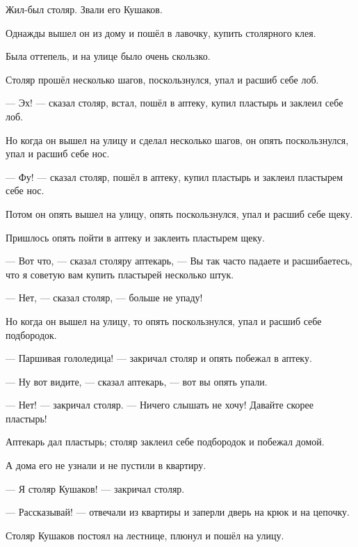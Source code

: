 Жил-был столяр. Звали его Кушаков.

Однажды вышел он из дому и пошёл в лавочку, купить столярного клея.

Была оттепель, и на улице было очень скользко.

Столяр прошёл несколько шагов, поскользнулся, упал и расшиб себе лоб.

--- Эх! --- сказал столяр, встал, пошёл в аптеку, купил пластырь и заклеил себе лоб.

Но когда он вышел на улицу и сделал несколько шагов, он опять поскользнулся, упал и расшиб себе нос.

--- Фу! --- сказал столяр, пошёл в аптеку, купил пластырь и заклеил пластырем себе нос.

Потом он опять вышел на улицу, опять поскользнулся, упал и расшиб себе щеку.

Пришлось опять пойти в аптеку и заклеить пластырем щеку.

--- Вот что, --- сказал столяру аптекарь, --- Вы так часто падаете и расшибаетесь, что я советую вам купить пластырей несколько штук.

--- Нет, --- сказал столяр, --- больше не упаду!

Но когда он вышел на улицу, то опять поскользнулся, упал и расшиб себе подбородок.

--- Паршивая гололедица! --- закричал столяр и опять побежал в аптеку.

--- Ну вот видите, --- сказал аптекарь, --- вот вы опять упали.

--- Нет! --- закричал столяр. --- Ничего слышать не хочу! Давайте скорее пластырь!

Аптекарь дал пластырь; столяр заклеил себе подбородок и побежал домой.

А дома его не узнали и не пустили в квартиру.

--- Я столяр Кушаков! --- закричал столяр.

--- Рассказывай! --- отвечали из квартиры и заперли дверь на крюк и на цепочку.

Столяр Кушаков постоял на лестнице, плюнул и пошёл на улицу.